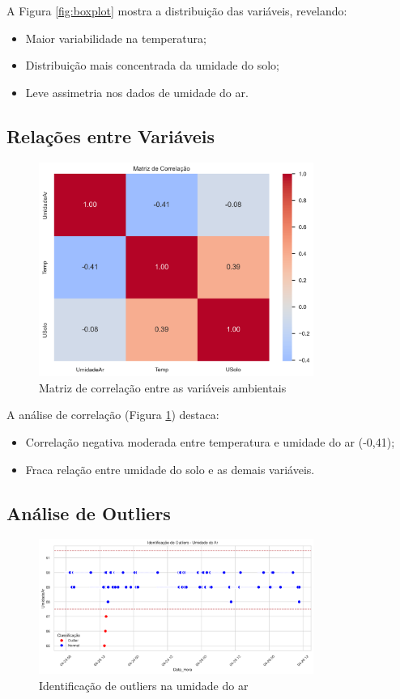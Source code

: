 \documentclass[12pt, a4paper]{article}
\begin{document}
A Figura \ref{fig:boxplot} mostra a distribuição das variáveis, revelando:
\begin{itemize}
    \item Maior variabilidade na temperatura;
    \item Distribuição mais concentrada da umidade do solo;
    \item Leve assimetria nos dados de umidade do ar.
\end{itemize}

\subsection{Relações entre Variáveis}
\begin{figure}[H]
\centering
\includegraphics[width=0.8\textwidth]{graficos/matriz_correlacao.png}
\caption{Matriz de correlação entre as variáveis ambientais}
\label{fig:correlacao}
\end{figure}

A análise de correlação (Figura \ref{fig:correlacao}) destaca:
\begin{itemize}
    \item Correlação negativa moderada entre temperatura e umidade do ar (-0,41);
    \item Fraca relação entre umidade do solo e as demais variáveis.
\end{itemize}

\subsection{Análise de Outliers}
\begin{figure}[H]
\centering
\includegraphics[width=0.8\textwidth]{graficos/outliers_umidade.png}
\caption{Identificação de outliers na umidade do ar}
\label{fig:outliers}
\end{figure}
\end{document}

